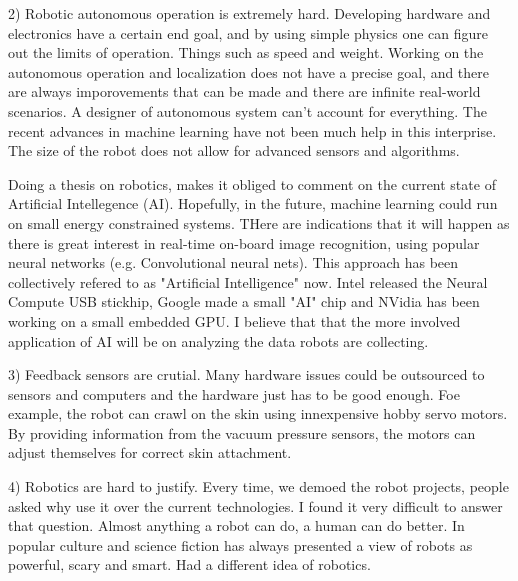 2) Robotic autonomous operation is extremely hard. Developing hardware and electronics have a certain end goal, and by using simple physics one can figure out the limits of operation. Things such as speed and weight. Working on the autonomous operation and localization does not have a precise goal, and there are always imporovements that can be made and there are infinite real-world scenarios. A designer of autonomous system can't account for everything. The recent advances in machine learning have not been much help in this interprise. The size of the robot does not allow for advanced sensors and algorithms. 

Doing a thesis on robotics, makes it obliged to comment on the current state of Artificial Intellegence (AI). Hopefully, in the future, machine learning could run on small energy constrained systems. THere are indications that it will happen as there is great interest in real-time on-board image recognition, using popular neural networks (e.g. Convolutional neural nets). This approach has been collectively refered to as "Artificial Intelligence" now. Intel released the Neural Compute USB stickhip,  Google made a small "AI" chip and NVidia has been working on a small embedded GPU. I believe that that the more involved application of AI will be on analyzing the data robots are collecting. 

3) Feedback sensors are crutial. Many hardware issues could be outsourced to sensors and computers and the hardware just has to be good enough. Foe example, the robot can crawl on the skin using innexpensive hobby servo motors. By providing information from the vacuum pressure sensors, the motors can adjust themselves for correct skin attachment. 

4) Robotics are hard to justify. Every time, we demoed the robot projects, people asked why use it over the current technologies. I found it very difficult to answer that question. Almost anything a robot can do, a human can do better. In popular culture and science fiction has always presented a view of robots as powerful, scary and smart.   Had a different idea of robotics. 




